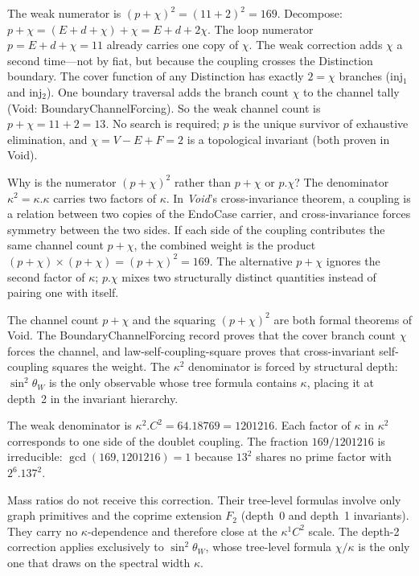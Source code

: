 \documentclass[11pt,a4paper]{book}
\def\cdot{.}%
\def\texttt#1{#1}%
\begin{document}
The weak numerator is $(p + \chi)^2 = (11 + 2)^2 = 169$.
Decompose:\ $p + \chi = (E + d + \chi) + \chi = E + d + 2\chi$.
The loop numerator $p = E + d + \chi = 11$ already carries one copy
of $\chi$.  The weak correction adds $\chi$ a second time---not
by fiat, but because the coupling crosses the Distinction boundary.
The cover function of any Distinction has exactly $2 = \chi$ branches
(\texttt{inj}$_1$ and \texttt{inj}$_2$).  One boundary traversal adds
the branch count $\chi$ to the channel tally
(Void: \texttt{BoundaryChannelForcing}).
So the weak channel count is $p + \chi = 11 + 2 = 13$.
No search is required; $p$ is the unique survivor of exhaustive
elimination, and $\chi = V - E + F = 2$ is a topological invariant
(both proven in Void).

Why is the numerator $(p + \chi)^2$ rather than $p + \chi$ or
$p \cdot \chi$?  The denominator $\kappa^2 = \kappa \cdot \kappa$
carries two factors of $\kappa$.  In \textit{Void}'s cross-invariance theorem, a coupling
is a relation between two copies of the EndoCase carrier, and
cross-invariance forces symmetry between the two sides.  If each
side of the coupling contributes the same channel count $p + \chi$,
the combined weight is the product $(p + \chi) \times (p + \chi)
= (p + \chi)^2 = 169$.  The alternative $p + \chi$ ignores the
second factor of $\kappa$; $p \cdot \chi$ mixes two structurally
distinct quantities instead of pairing one with itself.

The channel count $p + \chi$ and the squaring $(p + \chi)^2$ are
both formal theorems of Void.  The \texttt{BoundaryChannelForcing}
record proves that the cover branch count $\chi$ forces the
channel, and \texttt{law-self-coupling-square} proves that
cross-invariant self-coupling squares the weight.  The $\kappa^2$
denominator is forced by structural depth: $\sin^2\!\theta_W$ is
the only observable whose tree formula contains $\kappa$, placing
it at depth~2 in the invariant hierarchy.

The weak denominator is $\kappa^2 \cdot C^2 = 64 \cdot 18769 = 1201216$.
Each factor of $\kappa$ in $\kappa^2$ corresponds to one side of the
doublet coupling.  The fraction $169/1201216$ is irreducible:
$\gcd(169, 1201216) = 1$ because $13^2$ shares no prime factor with
$2^6 \cdot 137^2$.

Mass ratios do not receive this correction.  Their tree-level
formulas involve only graph primitives and the coprime extension $F_2$
(depth~0 and depth~1 invariants).  They carry no $\kappa$-dependence
and therefore close at the $\kappa^1 C^2$ scale.  The depth-2
correction applies exclusively to $\sin^2\!\theta_W$, whose
tree-level formula $\chi/\kappa$ is the only one that draws on
the spectral width $\kappa$.
\end{document}
